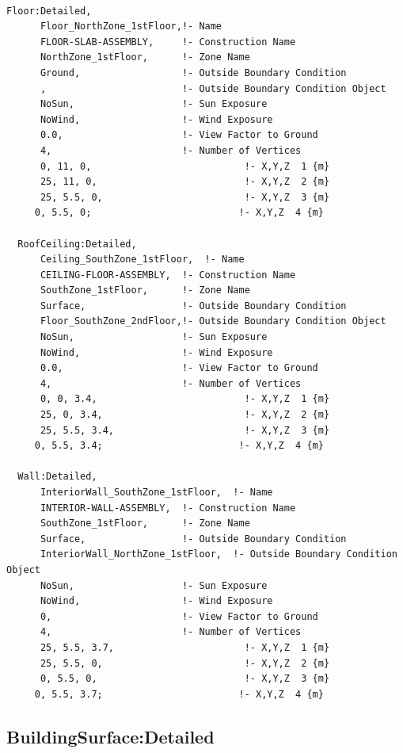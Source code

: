 \begin{lstlisting}

Floor:Detailed,
      Floor_NorthZone_1stFloor,!- Name
      FLOOR-SLAB-ASSEMBLY,     !- Construction Name
      NorthZone_1stFloor,      !- Zone Name
      Ground,                  !- Outside Boundary Condition
      ,                        !- Outside Boundary Condition Object
      NoSun,                   !- Sun Exposure
      NoWind,                  !- Wind Exposure
      0.0,                     !- View Factor to Ground
      4,                       !- Number of Vertices
      0, 11, 0,                           !- X,Y,Z  1 {m}
      25, 11, 0,                          !- X,Y,Z  2 {m}
      25, 5.5, 0,                         !- X,Y,Z  3 {m}
     0, 5.5, 0;                          !- X,Y,Z  4 {m}

  RoofCeiling:Detailed,
      Ceiling_SouthZone_1stFloor,  !- Name
      CEILING-FLOOR-ASSEMBLY,  !- Construction Name
      SouthZone_1stFloor,      !- Zone Name
      Surface,                 !- Outside Boundary Condition
      Floor_SouthZone_2ndFloor,!- Outside Boundary Condition Object
      NoSun,                   !- Sun Exposure
      NoWind,                  !- Wind Exposure
      0.0,                     !- View Factor to Ground
      4,                       !- Number of Vertices
      0, 0, 3.4,                          !- X,Y,Z  1 {m}
      25, 0, 3.4,                         !- X,Y,Z  2 {m}
      25, 5.5, 3.4,                       !- X,Y,Z  3 {m}
     0, 5.5, 3.4;                        !- X,Y,Z  4 {m}

  Wall:Detailed,
      InteriorWall_SouthZone_1stFloor,  !- Name
      INTERIOR-WALL-ASSEMBLY,  !- Construction Name
      SouthZone_1stFloor,      !- Zone Name
      Surface,                 !- Outside Boundary Condition
      InteriorWall_NorthZone_1stFloor,  !- Outside Boundary Condition Object
      NoSun,                   !- Sun Exposure
      NoWind,                  !- Wind Exposure
      0,                       !- View Factor to Ground
      4,                       !- Number of Vertices
      25, 5.5, 3.7,                       !- X,Y,Z  1 {m}
      25, 5.5, 0,                         !- X,Y,Z  2 {m}
      0, 5.5, 0,                          !- X,Y,Z  3 {m}
     0, 5.5, 3.7;                        !- X,Y,Z  4 {m}
\end{lstlisting}

\subsection{BuildingSurface:Detailed}\label{buildingsurfacedetailed}

